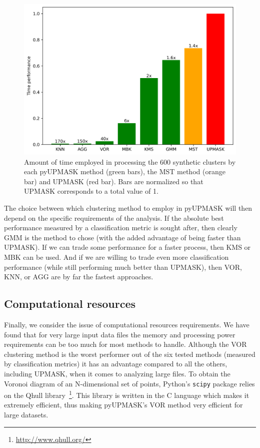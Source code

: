 \documentclass[draft]{aa}
\begin{document}
 \begin{figure}
  \centering
  \includegraphics[width=\hsize]{figs/time_analysis.png}
  \caption{Amount of time employed in processing the 600 synthetic
  clusters by each pyUPMASK method (green bars), the MST method (orange bar)
  and UPMASK (red bar). Bars are normalized so that UPMASK corresponds to a
  total value of 1.}
  \label{fig:timeanalys}
 \end{figure}

 The choice between which clustering method to employ in pyUPMASK will then
 depend on the specific requirements of the analysis. If the absolute best
 performance measured by a classification metric is sought after, then clearly
 GMM is the method to chose (with the added advantage of being faster than
 UPMASK). If we can trade some performance for a faster
 process, then KMS or MBK can be used. And if we are willing to trade even more
 classification performance (while still performing much better than UPMASK),
 then VOR, KNN, or AGG are by far the fastest approaches.





\subsection{Computational resources}
 \label{ssec:vor_ngc2516}

 Finally, we consider the issue of computational resources requirements.
 We have found that for very large input data files the memory and
 processing power requirements can be too much for most methods to handle.
 Although the VOR clustering method is the worst performer out of the six
 tested methods (measured by classification metrics) it has an advantage
 compared to all the others, including UPMASK, when it comes to analyzing large
 files. 
 To obtain the Voronoi diagram of an N-dimensional set of points, Python's 
 \texttt{scipy} package relies on the Qhull
 library~\citep{Barber_1996}\footnote{\url{http://www.qhull.org/}}.
 This library is written in the C language which makes it extremely efficient,
 thus making pyUPMASK's VOR method very efficient for large datasets.
\end{document}
